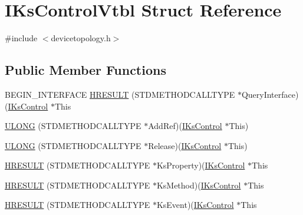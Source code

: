\hypertarget{struct_i_ks_control_vtbl}{}\section{I\+Ks\+Control\+Vtbl Struct Reference}
\label{struct_i_ks_control_vtbl}


{\ttfamily \#include $<$devicetopology.\+h$>$}

\subsection*{Public Member Functions}
\begin{DoxyCompactItemize}
\item 
B\+E\+G\+I\+N\+\_\+\+I\+N\+T\+E\+R\+F\+A\+CE \hyperlink{struct_i_ks_control_vtbl_a609826c07075234bb3771c432876d4f6}{H\+R\+E\+S\+U\+LT} (S\+T\+D\+M\+E\+T\+H\+O\+D\+C\+A\+L\+L\+T\+Y\+PE $\ast$Query\+Interface)(\hyperlink{devicetopology_8h_af7768dcb43e0eaaae7ac0ac562378e4d}{I\+Ks\+Control} $\ast$This
\item 
\hyperlink{struct_i_ks_control_vtbl_aae3f0def17c6497582a6236050236922}{U\+L\+O\+NG} (S\+T\+D\+M\+E\+T\+H\+O\+D\+C\+A\+L\+L\+T\+Y\+PE $\ast$Add\+Ref)(\hyperlink{devicetopology_8h_af7768dcb43e0eaaae7ac0ac562378e4d}{I\+Ks\+Control} $\ast$This)
\item 
\hyperlink{struct_i_ks_control_vtbl_a84672fbc87d4c13d0796b4ef4ee7c252}{U\+L\+O\+NG} (S\+T\+D\+M\+E\+T\+H\+O\+D\+C\+A\+L\+L\+T\+Y\+PE $\ast$Release)(\hyperlink{devicetopology_8h_af7768dcb43e0eaaae7ac0ac562378e4d}{I\+Ks\+Control} $\ast$This)
\item 
\hyperlink{struct_i_ks_control_vtbl_afdc2f6c6363251428e580e12ee83569a}{H\+R\+E\+S\+U\+LT} (S\+T\+D\+M\+E\+T\+H\+O\+D\+C\+A\+L\+L\+T\+Y\+PE $\ast$Ks\+Property)(\hyperlink{devicetopology_8h_af7768dcb43e0eaaae7ac0ac562378e4d}{I\+Ks\+Control} $\ast$This
\item 
\hyperlink{struct_i_ks_control_vtbl_a5ae8d90a186c668ad1ff6b50e1a5a0b9}{H\+R\+E\+S\+U\+LT} (S\+T\+D\+M\+E\+T\+H\+O\+D\+C\+A\+L\+L\+T\+Y\+PE $\ast$Ks\+Method)(\hyperlink{devicetopology_8h_af7768dcb43e0eaaae7ac0ac562378e4d}{I\+Ks\+Control} $\ast$This
\item 
\hyperlink{struct_i_ks_control_vtbl_a2bebd473bb802d8bb02a7c797a064991}{H\+R\+E\+S\+U\+LT} (S\+T\+D\+M\+E\+T\+H\+O\+D\+C\+A\+L\+L\+T\+Y\+PE $\ast$Ks\+Event)(\hyperlink{devicetopology_8h_af7768dcb43e0eaaae7ac0ac562378e4d}{I\+Ks\+Control} $\ast$This
\end{DoxyCompactItemize}
